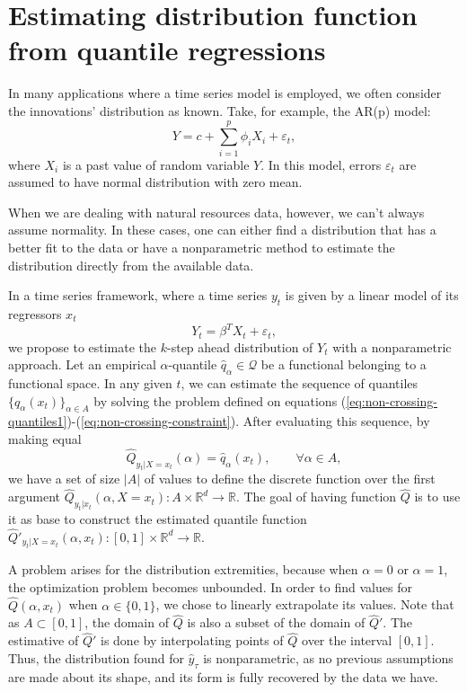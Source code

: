 \section{Estimating distribution function from quantile regressions}
\label{sec:estimating-distribution}

In many applications where a time series model is employed, we often consider the innovations' distribution as known. Take, for example, the AR(p) model:
$$Y=c+\sum_{i=1}^{p}\phi_{i}X_i+\varepsilon_{t},$$
where $X_i$ is a past value of random variable $Y$.
In this model, errors $\varepsilon_t$ are assumed to have normal distribution with zero mean. 

When we are dealing with natural resources data, however, we can't always assume normality. In these cases, one can either find a distribution that has a better fit to the data or have a nonparametric method to estimate the distribution directly from the available data.

In a time series framework, where a time series $y_t$ is given by a linear model of its regressors $x_t$
$$Y_t = \beta^T X_t + \varepsilon_t,$$
we propose to estimate the $k$-step ahead distribution of $Y_t$ with a nonparametric approach.
Let an empirical $\alpha$-quantile $\hat{q}_\alpha \in \mathcal{Q}$ be a functional belonging to a functional space. In any given $t$, we can estimate the sequence of quantiles $\{ q_{\alpha}(x_t) \}_{\alpha \in A}$ by solving the problem defined on equations (\ref{eq:non-crossing-quantiles1})-(\ref{eq:non-crossing-constraint}). 
 After evaluating this sequence, by making equal 
\begin{equation}
\hat{Q}_{y_t|X=x_t}(\alpha) = \hat{q}_\alpha(x_t), \qquad \forall \alpha \in A,
\end{equation}
we have a set of size $|A|$ of values to define the discrete function over the first argument $\hat{Q}_{y_t|x_t}(\alpha,X=x_t): A \times \mathbb{R}^d \rightarrow \mathbb{R}$. The goal of having function $\hat{Q}$ is to use it as base to construct the estimated quantile function $\hat{Q}'_{y_t|X=x_t}(\alpha,x_t): [0,1] \times \mathbb{R}^d \rightarrow \mathbb{R}$. 

A problem arises for the distribution extremities, because when $\alpha = 0$ or $\alpha = 1$, the optimization problem becomes unbounded. In order to find values for $\hat{Q}(\alpha,x_t)$ when $\alpha \in \{0,1\}$, we chose to linearly extrapolate its values. %
Note that as $A \subset [0,1]$, the domain of $\hat{Q}$ is also a subset of the domain of $\hat{Q}'$. 
The estimative of $\hat{Q}'$ is done by interpolating points of $\hat{Q}$ over the interval $[0,1]$.
Thus, the distribution found for $\hat{y}_{\tau}$ is nonparametric, as no previous assumptions are made about its shape, and its form is fully recovered by the data we have.


